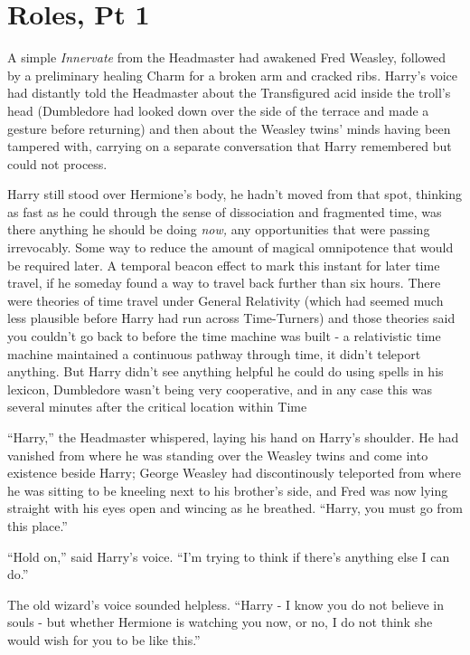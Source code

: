 \chapter{Roles, Pt 1}\label{roles-pt-1}

A simple \emph{Innervate} from the Headmaster had awakened Fred Weasley,
followed by a preliminary healing Charm for a broken arm and cracked
ribs. Harry's voice had distantly told the Headmaster about the
Transfigured acid inside the troll's head (Dumbledore had looked down
over the side of the terrace and made a gesture before returning) and
then about the Weasley twins' minds having been tampered with, carrying
on a separate conversation that Harry remembered but could not process.

Harry still stood over Hermione's body, he hadn't moved from that spot,
thinking as fast as he could through the sense of dissociation and
fragmented time, was there anything he should be doing \emph{now,} any
opportunities that were passing irrevocably. Some way to reduce the
amount of magical omnipotence that would be required later. A temporal
beacon effect to mark this instant for later time travel, if he someday
found a way to travel back further than six hours. There were theories
of time travel under General Relativity (which had seemed much less
plausible before Harry had run across Time-Turners) and those theories
said you couldn't go back to before the time machine was built - a
relativistic time machine maintained a continuous pathway through time,
it didn't teleport anything. But Harry didn't see anything helpful he
could do using spells in his lexicon, Dumbledore wasn't being very
cooperative, and in any case this was several minutes after the critical
location within Time

``Harry,'' the Headmaster whispered, laying his hand on Harry's
shoulder. He had vanished from where he was standing over the Weasley
twins and come into existence beside Harry; George Weasley had
discontinously teleported from where he was sitting to be kneeling next
to his brother's side, and Fred was now lying straight with his eyes
open and wincing as he breathed. ``Harry, you must go from this place.''

``Hold on,'' said Harry's voice. ``I'm trying to think if there's
anything else I can do.''

The old wizard's voice sounded helpless. ``Harry - I know you do not
believe in souls - but whether Hermione is watching you now, or no, I do
not think she would wish for you to be like this.''


